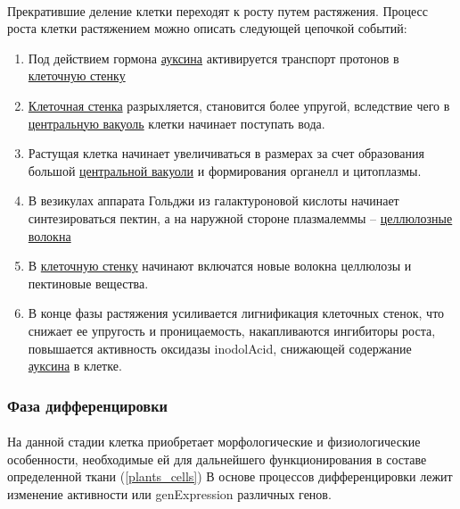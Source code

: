 \paragraph*{}Прекратившие деление клетки переходят к росту путем \hypertarget{strainGrowth}{растяжения}. Процесс роста клетки растяжением можно описать следующей цепочкой событий:

\begin{enumerate}
	\item Под действием гормона \hyperlink{auxin}{ауксина} активируется транспорт протонов в \hyperlink{cell_wall}{клеточную стенку}
	\item \hyperlink{cell_wall}{Клеточная стенка} разрыхляется, становится более упругой, вследствие чего в \hyperlink{cell_vakuol}{центральную вакуоль} клетки начинает поступать вода.
	\item Растущая клетка начинает увеличиваться в размерах за счет образования большой \hyperlink{cell_vakuol}{центральной вакуоли} и формирования органелл и цитоплазмы. 
	\item В везикулах аппарата Гольджи из галактуроновой кислоты начинает синтезироваться пектин, а на наружной стороне плазмалеммы -- \hyperlink{cellulosa}{целлюлозные волокна}
	\item В \hyperlink{cell_wall}{клеточную стенку} начинают включатся новые волокна целлюлозы и пектиновые вещества. 
	\item В конце фазы растяжения усиливается лигнификация клеточных стенок, что снижает ее упругость и проницаемость, накапливаются ингибиторы роста, повышается активность оксидазы \gls{inodolAcid}, снижающей содержание \hyperlink{auxsin}{ауксина} в клетке.
\end{enumerate}

\subsubsection*{Фаза дифференцировки}

\paragraph*{}На данной стадии клетка приобретает морфологические и физиологические особенности, необходимые ей для дальнейшего функционирования в составе определенной ткани (\ris \ref{plants_cells}) В основе процессов дифференцировки лежит изменение активности или \gls{genExpression} различных генов. 

